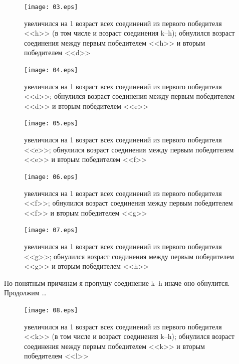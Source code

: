 \documentclass[unicode, 12pt, a4paper,oneside,fleqn]{article}
\begin{document}
\begin{figure}[h]
  \center
  \texttt{[image: 03.eps]}
  \caption{увеличился на 1 возраст всех соединений из первого
    победителя <<h>> (в том числе и возраст соединения k--h);
    обнулился возраст соединения между первым победителем <<h>> и
    вторым победителем <<d>>}
  \label{conn-step:03}
\end{figure}

\begin{figure}[h]
  \center
  \texttt{[image: 04.eps]}
  \caption{увеличился на 1 возраст всех соединений из первого
    победителя <<d>>; обнулился возраст соединения между первым
    победителем <<d>> и вторым победителем <<e>>}
  \label{conn-step:04}
\end{figure}

\begin{figure}[h]
  \center
  \texttt{[image: 05.eps]}
  \caption{увеличился на 1 возраст всех соединений из первого
    победителя <<e>>; обнулился возраст соединения между первым
    победителем <<e>> и вторым победителем <<f>>}
  \label{conn-step:05}
\end{figure}

\begin{figure}[h]
  \center
  \texttt{[image: 06.eps]}
  \caption{увеличился на 1 возраст всех соединений из первого
    победителя <<f>>; обнулился возраст соединения между первым
    победителем <<f>> и вторым победителем <<g>>}
  \label{conn-step:06}
\end{figure}

\begin{figure}[h]
  \center
  \texttt{[image: 07.eps]}
  \caption{увеличился на 1 возраст всех соединений из первого
    победителя <<g>>; обнулился возраст соединения между первым
    победителем <<g>> и вторым победителем <<h>>}
  \label{conn-step:07}
\end{figure}

\clearpage
По понятным причинам я пропущу соединение k--h иначе оно
обнулится. Продолжим \ldots

\begin{figure}[h]
  \center
  \texttt{[image: 08.eps]}
  \caption{увеличился на 1 возраст всех соединений из первого
    победителя <<k>> (в том числе и возраст соединения k--h);
    обнулился возраст соединения между первым победителем <<k>> и
    вторым победителем <<l>>}
  \label{conn-step:08}
\end{figure}
\end{document}
